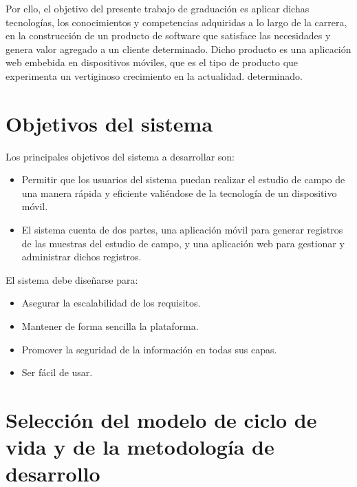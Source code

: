Por ello, el objetivo del presente trabajo de graduación es aplicar dichas tecnologías, los conocimientos y competencias adquiridas a lo largo de la carrera, en la construcción de un producto de software que satisface las necesidades y genera valor agregado a un cliente determinado. Dicho producto es una aplicación web embebida en dispositivos móviles, que es el tipo de producto que experimenta un vertiginoso crecimiento en la actualidad.
determinado. 

\section{Objetivos del sistema}

Los principales objetivos del sistema a desarrollar son:

\begin{itemize}
    \item Permitir que los usuarios del sistema puedan realizar el estudio de campo de una manera rápida y eficiente valiéndose de la tecnología de un dispositivo móvil.
    \item El sistema cuenta de dos partes, una aplicación móvil para generar registros de las muestras del estudio de campo, y una aplicación web para gestionar y administrar dichos registros.
\end{itemize}

El sistema debe diseñarse para:

\begin{itemize}
    \item Asegurar la escalabilidad de los requisitos.
    \item Mantener de forma sencilla la plataforma.
    \item Promover la seguridad de la información en todas sus capas.
    \item Ser fácil de usar.
\end{itemize}

\section{Selección del modelo de ciclo de vida y de la metodología de desarrollo}

